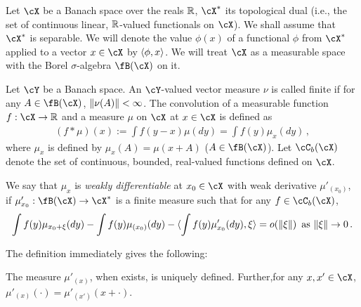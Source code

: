 \documentclass[11pt,letterpaper,english]{article}
\newcommand{\Borel}{\fB}
\newcommand{\Cb}{\cC_b}
\begin{document}
Let $\cX$ be a Banach space over the reals $\mathbb{R}$, 
$\cX^*$ its topological dual (i.e., the set of continuous linear, $\mathbb{R}$-valued functionals on $\cX$). 
We shall assume that $\cX^*$ is separable. 
We will denote the value $\phi(x)$ of a functional $\phi$ from $\cX^*$ applied to a vector $x\in \cX$ by $\langle \phi,x \rangle$.
We will treat $\cX$ as a measurable space with the Borel $\sigma$-algebra $\Borel(\cX)$ on it. 

Let $\cY$ be a Banach space.
An $\cY$-valued vector measure $\nu$ is called finite if for any $A\in \Borel(\cX)$, $\|\nu(A)\|<\infty$.
The convolution of a measurable function  $f: \cX \to \R$  and a measure $\mu$ on $\cX$ at $x\in \cX$ is defined as
\begin{align*}
\left( f*\mu \right) (x) := \int f(y-x)\mu (d y)
 = \int f(y)\mu_x(dy)\,,
\end{align*}
where $\mu_x$ is defined by $\mu_x(A) = \mu(x+A)$ ($A\in \Borel(\cX)$). 
Let $\Cb(\cX)$ denote the set of continuous, bounded, real-valued functions defined on $\cX$.
\begin{definition}
We say that $\mu_x$ is \emph{weakly differentiable} 
at $x_0\in \cX$ with weak derivative $\mu'_{(x_0)}$, if 
 $\mu'_{x_0}: \Borel(\cX)\to \cX^*$ is a finite measure such that for any $f \in \Cb(\cX)$,
\begin{align*}
\int f(y)\mu_{x_0+\xi}(dy) - \int f(y)\mu_{(x_0)}(dy)
-\langle \int f(y)\mu'_{x_0}(dy), \xi \rangle = o(\|\xi\|) \,\text{ as } \|\xi\|\to 0\,.
\end{align*}
\end{definition}
The definition immediately gives the following:
\begin{proposition}
The measure $\mu'_{(x)}$, when exists, is uniquely defined.
Further,for any $x,x'\in \cX$,  $\mu'_{(x)}(\cdot) = \mu'_{(x')}(x+\cdot)$.
\end{proposition}
\end{document}
